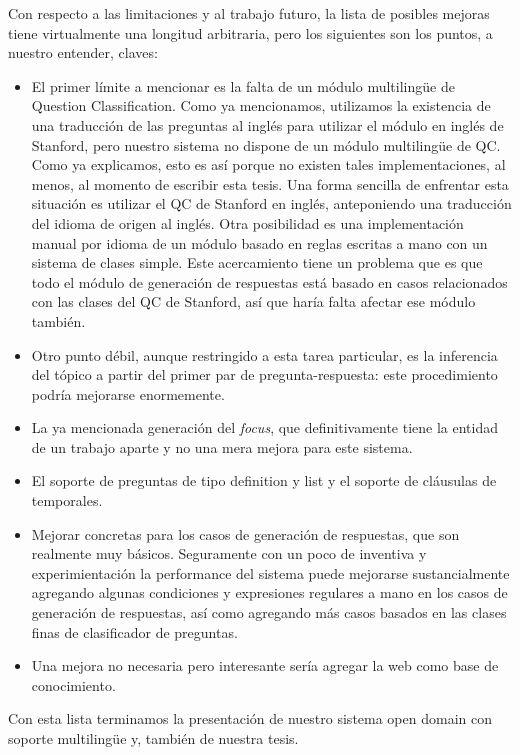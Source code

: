 Con respecto a las limitaciones y al trabajo futuro, la lista de posibles mejoras tiene virtualmente una longitud arbitraria, pero los siguientes son los puntos, a nuestro entender, claves:
\begin{itemize}
  \item El primer límite a mencionar es la falta de un módulo multilingüe de Question Classification. Como ya mencionamos, utilizamos la existencia de una traducción de las preguntas al inglés para utilizar el módulo en inglés de Stanford, pero nuestro sistema no dispone de un módulo multilingüe de QC. Como ya explicamos, esto es así porque no existen tales implementaciones, al menos, al momento de escribir esta tesis. Una forma sencilla de enfrentar esta situación es utilizar el QC de Stanford en inglés, anteponiendo una traducción del idioma de origen al inglés. Otra posibilidad es una implementación manual por idioma de un módulo basado en reglas escritas a mano con un sistema de clases simple. Este acercamiento tiene un problema que es que todo el módulo de generación de respuestas está basado en casos relacionados con las clases del QC de Stanford, así que haría falta afectar ese módulo también.
  \item Otro punto débil, aunque restringido a esta tarea particular, es la inferencia del tópico a partir del primer par de pregunta-respuesta: este procedimiento podría mejorarse enormemente.
  \item La ya mencionada generación del \textit{focus}, que definitivamente tiene la entidad de un trabajo aparte y no una mera mejora para este sistema.
  \item El soporte de preguntas de tipo definition y list y el soporte de cláusulas de temporales.
  \item Mejorar concretas para los casos de generación de respuestas, que son realmente muy básicos. Seguramente con un poco de inventiva y experimientación la performance del sistema puede mejorarse sustancialmente agregando algunas condiciones y expresiones regulares a mano en los casos de generación de respuestas, así como agregando más casos basados en las clases finas de clasificador de preguntas.
  \item Una mejora no necesaria pero interesante sería agregar la web como base de conocimiento.
\end{itemize}


Con esta lista terminamos la presentación de nuestro sistema open domain con soporte multilingüe y, también de nuestra tesis.